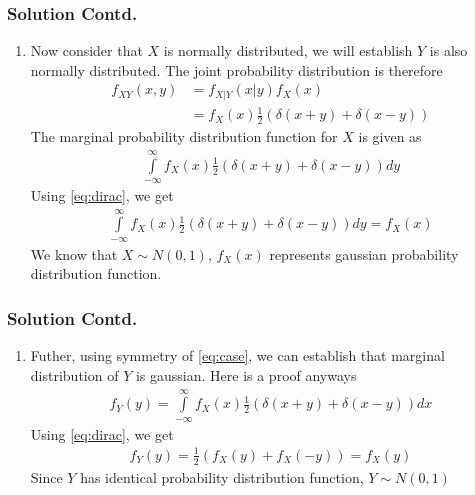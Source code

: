 \documentclass{beamer}
\providecommand{\brak}[1]{\ensuremath{\left(#1\right)}}
\begin{document}
 \begin{frame}
 \frametitle{Solution Contd.}
\begin{enumerate}\item
Now consider that $X$ is normally distributed, we will establish $Y$ is also normally distributed.
The joint probability distribution is therefore
\begin{align}
f_{XY}(x,y)&=f_{X|Y}(x|y)f_X(x)\nonumber \\
&=f_X(x)\frac{1}{2}(\delta(x+y)+\delta(x-y))\label{eq:counter}
\end{align}
The marginal probability distribution function for $X$ is given as
\begin{align}
\int\limits_{-\infty}^{\infty}f_X(x)\frac{1}{2}(\delta(x+y)+\delta(x-y)) dy
\end{align}
Using \eqref{eq:dirac}, we get
\begin{align}
\int\limits_{-\infty}^{\infty}f_X(x)\frac{1}{2}(\delta(x+y)+\delta(x-y))dy=f_X(x)
\end{align}
We know that $X\sim N(0,1)$, $f_X(x)$ represents gaussian probability distribution function.
\end{enumerate}
\end{frame}

\begin{frame}
 \frametitle{Solution Contd.}
\begin{enumerate}\item
Futher, using symmetry of \eqref{eq:case}, we can establish that marginal distribution of $Y$ is gaussian. Here is a proof anyways
\begin{align}
f_Y(y)=\int\limits_{-\infty}^{\infty}f_X(x)\frac{1}{2}(\delta(x+y)+\delta(x-y)) dx
\end{align}
Using \eqref{eq:dirac}, we get
\begin{align}
f_Y(y)=\frac{1}{2}\brak{f_X(y)+f_X(-y)}=f_X(y)
\end{align}
Since $Y$ has identical probability distribution function, $Y\sim N(0,1)$
\end{enumerate}
\end{frame}
 
\end{document}
